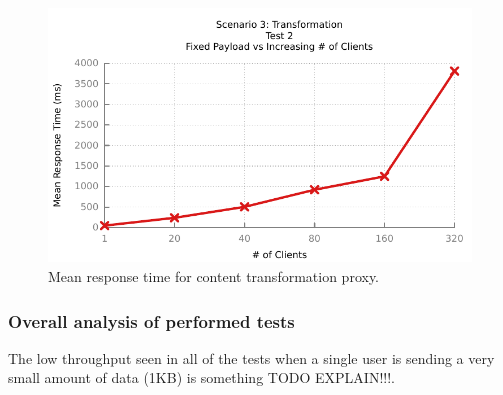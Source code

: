 \begin{figure}[htpb]
	\centerline{\includegraphics{img/transform_fp_iu_resp}}
	\caption{Mean response time for content transformation proxy.}
	\label{fig:transform-2-2}
\end{figure}

\subsubsection{Overall analysis of performed tests}
\label{sec:test-final-analysis}

The low throughput seen in all of the tests when a single user is sending a very small amount of data (1KB) is something TODO EXPLAIN!!!.